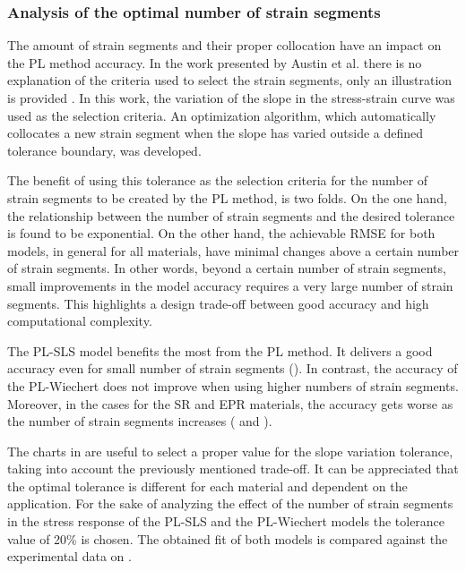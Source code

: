 \subsubsection{Analysis of the optimal number of strain segments}

The amount of strain segments and their proper collocation have an impact on the PL method accuracy. In the work presented by Austin et al. there is no explanation of the criteria used to select the strain segments, only an illustration is provided \cite{austin2015control}. In this work, the variation of the slope in the stress-strain curve was used as the selection criteria. An optimization algorithm, which automatically collocates a new strain segment when the slope has varied outside a defined tolerance boundary, was developed.

The benefit of using this tolerance as the selection criteria for the number of strain segments to be created by the PL method, is two folds. On the one hand, the relationship between the number of strain segments and the desired tolerance is found to be exponential. On the other hand, the achievable RMSE for both models, in general for all materials, have minimal changes above a certain number of strain segments. In other words, beyond a certain number of strain segments, small improvements in the model accuracy requires a very large number of strain segments. This highlights a design trade-off between good accuracy and high computational complexity.

The PL-SLS model benefits the most from the PL method. It delivers a good accuracy even for small number of strain segments (). In contrast, the accuracy of the PL-Wiechert does not improve when using higher numbers of strain segments. Moreover, in the cases for the SR and EPR materials, the accuracy gets worse as the number of strain segments increases ( and ).

The charts in  are useful to select a proper value for the slope variation tolerance, taking into account the previously mentioned trade-off. It can be appreciated that the optimal tolerance is different for each material and dependent on the application. For the sake of analyzing the effect of the number of strain segments in the stress response of the PL-SLS and the PL-Wiechert models the tolerance value of 20\% is chosen. The obtained fit of both models is compared against the experimental data on .

